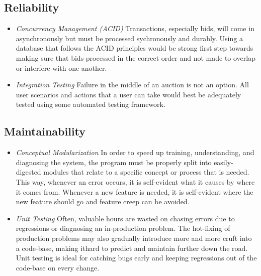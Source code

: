 \documentclass[titlepage, 12pt]{extarticle}
\begin{document}
\subsection{Reliability}
\begin{itemize}
\item {\it Concurrency Management (ACID)} Transactions, especially bids, will come in asynchronously but must be processed sychronously and durably. Using a database that follows the ACID principles would be strong first step towards making sure that bids processed in the correct order and not made to overlap or interfere with one another.
\item {\it Integration Testing} Failure in the middle of an auction is not an option. All user scenarios and actions that a user can take would best be adequately tested using some automated testing framework.
\end{itemize}
\subsection{Maintainability}
\begin{itemize}
\item {\it Conceptual Modularization} In order to speed up training, understanding, and diagnosing the system, the program must be properly split into easily-digested modules that relate to a specific concept or process that is needed. This way, whenever an error occurs, it is self-evident what it causes by where it comes from. Whenever a new feature is needed, it is self-evident where the new feature should go and feature creep can be avoided.
\item {\it Unit Testing} Often, valuable hours are wasted on chasing errors due to regressions or diagnosing an in-production problem. The hot-fixing of production problems may also gradually introduce more and more cruft into a code-base, making ithard to predict and maintain further down the road. Unit testing is ideal for catching bugs early and keeping regressions out of the code-base on every change.
\end{itemize}
\end{document}

